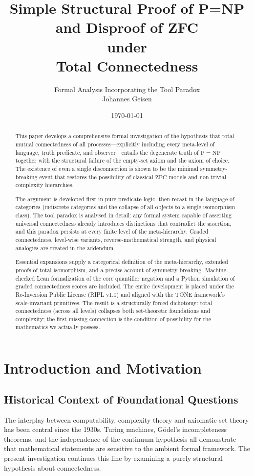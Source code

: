\documentclass[11pt,a4paper]{article}
\title{Simple Structural Proof of P=NP and Disproof of ZFC\\ under\\ Total Connectedness}
\author{Formal Analysis Incorporating the Tool Paradox\\Johannes Geisen}
\date{\today}
\theoremstyle{definition}
\begin{document}
\maketitle

\begin{abstract}
This paper develops a comprehensive formal investigation of the hypothesis that total mutual connectedness of all processes—explicitly including every meta-level of language, truth predicate, and observer—entails the degenerate truth of \(\mathrm{P}=\mathrm{NP}\) together with the structural failure of the empty-set axiom and the axiom of choice. The existence of even a single disconnection is shown to be the minimal symmetry-breaking event that restores the possibility of classical \(\mathrm{ZFC}\) models and non-trivial complexity hierarchies. 

The argument is developed first in pure predicate logic, then recast in the language of categories (indiscrete categories and the collapse of all objects to a single isomorphism class). The tool paradox is analysed in detail: any formal system capable of asserting universal connectedness already introduces distinctions that contradict the assertion, and this paradox persists at every finite level of the meta-hierarchy. Graded connectedness, level-wise variants, reverse-mathematical strength, and physical analogies are treated in the addendum. 

Essential expansions supply a categorical definition of the meta-hierarchy, extended proofs of total isomorphism, and a precise account of symmetry breaking. Machine-checked Lean formalization of the core quantifier negation and a Python simulation of graded connectedness scores are included. The entire development is placed under the Re-Inversion Public License (RIPL v1.0) and aligned with the TONE framework’s scale-invariant primitives. The result is a structurally forced dichotomy: total connectedness (across all levels) collapses both set-theoretic foundations and complexity; the first missing connection is the condition of possibility for the mathematics we actually possess.
\end{abstract}
\newpage
\tableofcontents
\newpage

\section{Introduction and Motivation}
\subsection{Historical Context of Foundational Questions}
The interplay between computability, complexity theory and axiomatic set theory has been central since the 1930s. Turing machines, Gödel’s incompleteness theorems, and the independence of the continuum hypothesis all demonstrate that mathematical statements are sensitive to the ambient formal framework. The present investigation continues this line by examining a purely structural hypothesis about connectedness.
\end{document}
